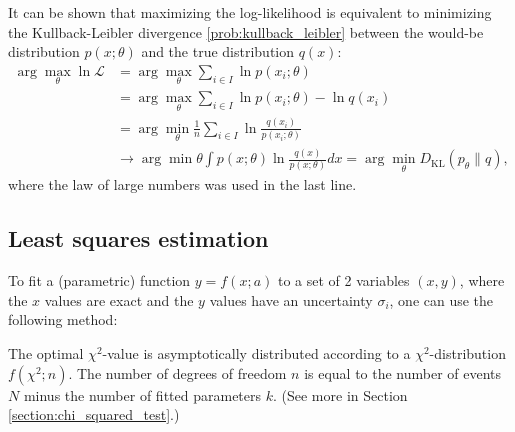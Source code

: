 {    \begin{property}\label{statistics:minimizing_KL}
        It can be shown that maximizing the log-likelihood is equivalent to minimizing the Kullback-Leibler divergence \ref{prob:kullback_leibler} between the would-be distribution $p(x;\theta)$ and the true distribution $q(x)$:
        \begin{align*}
            \arg\max_\theta\ln\mathcal{L} &= \arg\max_\theta\sum_{i\in I}\ln p(x_i;\theta)\\
            &= \arg\max_\theta\sum_{i\in I}\ln p(x_i;\theta) - \ln q(x_i)\\
            &= \arg\min_\theta\frac{1}{n}\sum_{i\in I}\ln\frac{q(x_i)}{p(x_i;\theta)}\\
            &\longrightarrow\arg\min\theta\int p(x;\theta)\ln\frac{q(x)}{p(x;\theta)}dx = \arg\min_\theta D_\mathrm{KL}(p_\theta\|q),
        \end{align*}
        where the law of large numbers was used in the last line.
    \end{property}

\subsection{Least squares estimation}

    To fit a (parametric) function $y = f(x;a)$ to a set of 2 variables $(x,y)$, where the $x$ values are exact and the $y$ values have an uncertainty $\sigma_i$, one can use the following method:
    \begin{property}
        The optimal $\chi^2$-value is asymptotically distributed according to a $\chi^2$-distribution $f(\chi^2;n)$. The number of degrees of freedom $n$ is equal to the number of events $N$ minus the number of fitted parameters $k$. (See more in Section \ref{section:chi_squared_test}.)
    \end{property}

}
